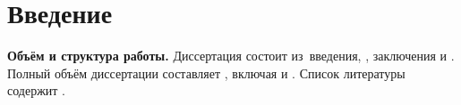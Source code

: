 \chapter*{Введение}                         %

\newcommand{\actuality}{\textbf{\actualityTXT}}
\newcommand{\progress}{\textbf{\progressTXT}}
\newcommand{\aim}{{\textbf\aimTXT}}
\newcommand{\tasks}{\textbf{\tasksTXT}}
\newcommand{\novelty}{\textbf{\noveltyTXT}}
\newcommand{\influence}{\textbf{\influenceTXT}}
\newcommand{\methods}{\textbf{\methodsTXT}}
\newcommand{\defpositions}{\textbf{\defpositionsTXT}}
\newcommand{\reliability}{\textbf{\reliabilityTXT}}
\newcommand{\probation}{\textbf{\probationTXT}}
\newcommand{\contribution}{\textbf{\contributionTXT}}
\newcommand{\publications}{\textbf{\publicationsTXT}}


\textbf{Объём и структура работы.} Диссертация состоит из~введения,
,
заключения и
.
%
Полный объём диссертации составляет
, включая
 и
.
Список литературы содержит
.
